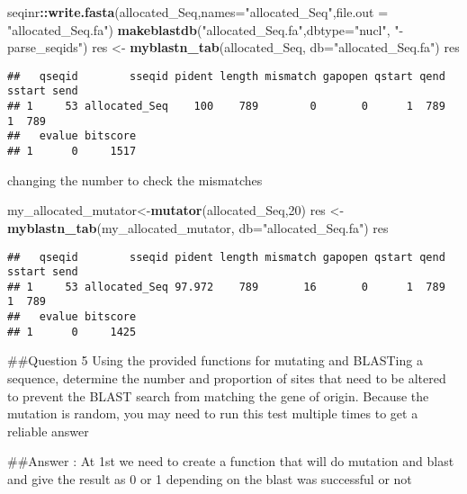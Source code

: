 \documentclass[]{article}
\newenvironment{Shaded}{\begin{snugshade}}{\end{snugshade}}
\newcommand{\DataTypeTok}[1]{\textcolor[rgb]{0.13,0.29,0.53}{#1}}
\newcommand{\DecValTok}[1]{\textcolor[rgb]{0.00,0.00,0.81}{#1}}
\newcommand{\KeywordTok}[1]{\textcolor[rgb]{0.13,0.29,0.53}{\textbf{#1}}}
\newcommand{\NormalTok}[1]{#1}
\newcommand{\OperatorTok}[1]{\textcolor[rgb]{0.81,0.36,0.00}{\textbf{#1}}}
\newcommand{\StringTok}[1]{\textcolor[rgb]{0.31,0.60,0.02}{#1}}
\begin{document}
\begin{Shaded}
\begin{Highlighting}[]
\NormalTok{seqinr}\OperatorTok{::}\KeywordTok{write.fasta}\NormalTok{(allocated_Seq,}\DataTypeTok{names=}\StringTok{"allocated_Seq"}\NormalTok{,}\DataTypeTok{file.out =} \StringTok{"allocated_Seq.fa"}\NormalTok{)}
\KeywordTok{makeblastdb}\NormalTok{(}\StringTok{"allocated_Seq.fa"}\NormalTok{,}\DataTypeTok{dbtype=}\StringTok{"nucl"}\NormalTok{, }\StringTok{"-parse_seqids"}\NormalTok{)}
\NormalTok{res <-}\StringTok{ }\KeywordTok{myblastn_tab}\NormalTok{(allocated_Seq, }\DataTypeTok{db=}\StringTok{"allocated_Seq.fa"}\NormalTok{)}
\NormalTok{res}
\end{Highlighting}
\end{Shaded}

\begin{verbatim}
##   qseqid        sseqid pident length mismatch gapopen qstart qend sstart send
## 1     53 allocated_Seq    100    789        0       0      1  789      1  789
##   evalue bitscore
## 1      0     1517
\end{verbatim}

changing the number to check the mismatches

\begin{Shaded}
\begin{Highlighting}[]
\NormalTok{my_allocated_mutator<-}\KeywordTok{mutator}\NormalTok{(allocated_Seq,}\DecValTok{20}\NormalTok{)}
\NormalTok{res <-}\StringTok{ }\KeywordTok{myblastn_tab}\NormalTok{(my_allocated_mutator, }\DataTypeTok{db=}\StringTok{"allocated_Seq.fa"}\NormalTok{)}
\NormalTok{res}
\end{Highlighting}
\end{Shaded}

\begin{verbatim}
##   qseqid        sseqid pident length mismatch gapopen qstart qend sstart send
## 1     53 allocated_Seq 97.972    789       16       0      1  789      1  789
##   evalue bitscore
## 1      0     1425
\end{verbatim}

\#\#Question 5 Using the provided functions for mutating and BLASTing a
sequence, determine the number and proportion of sites that need to be
altered to prevent the BLAST search from matching the gene of origin.
Because the mutation is random, you may need to run this test multiple
times to get a reliable answer

\#\#Answer : At 1st we need to create a function that will do mutation
and blast and give the result as 0 or 1 depending on the blast was
successful or not
\end{document}
